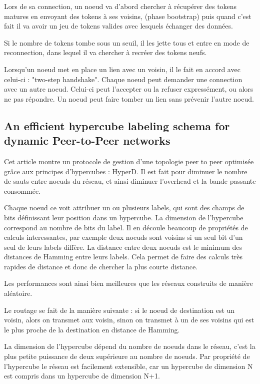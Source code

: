 \documentclass{article}
\begin{document}
Lors de sa connection, un noeud va d'abord chercher à récupérer des tokens matures en envoyant des tokens à ses
voisins, (phase bootstrap) puis quand c'est fait il va avoir un jeu de tokens valides avec lesquels échanger des
données.

Si le nombre de tokens tombe sous un seuil, il les jette tous et entre en mode de reconnection, dans lequel
il va chercher à recréer des tokens neufs.

Lorsqu'un noeud met en place un lien avec un voisin, il le fait en accord avec celui-ci : "two-step handshake". Chaque noeud
peut demander une connection avec un autre noeud. Celui-ci peut l'accepter ou la refuser expressément, ou alors
ne pas répondre. Un noeud peut faire tomber un lien sans prévenir l'autre noeud.

\subsection{An efficient hypercube labeling schema for dynamic Peer-to-Peer networks
\cite{Toce:2017:EHL:3050924.3051046}
}

Cet article montre un protocole de gestion d'une topologie peer to peer optimisée grâce aux principes d'hypercubes :
HyperD.
Il est fait pour diminuer le nombre de sauts entre noeuds du réseau, et ainsi diminuer l'overhead et la bande
passante consommée.

Chaque noeud ce voit attribuer un ou plusieurs labels, qui sont des champs de bits définissant leur position
dans un hypercube. La dimension de l'hypercube correspond au nombre de bits du label. Il en découle beaucoup
de propriétés de calculs interessantes, par exemple deux noeuds sont voisins si un seul bit d'un seul de leurs
labels diffère. La distance entre deux noeuds est le minimum des distances de Hamming entre leurs labels.
Cela permet de faire des calculs très rapides de distance et donc de chercher la plus courte distance.

Les performances sont ainsi bien meilleures que les réseaux construits de manière aléatoire.

Le routage se fait de la manière suivante : si le noeud de destination est un voisin, alors on transmet
aux voisin, sinon on transmet à un de ses voisins qui est le plus proche de la destination en distance de
Hamming.

La dimension de l'hypercube dépend du nombre de noeuds dans le réseau, c'est la plus petite puissance de deux supérieure au nombre de noeuds. Par propriété de l'hypercube le réseau est facilement extensible, car un hypercube de dimension N est compris dans un hypercube de dimension N+1.
\end{document}
